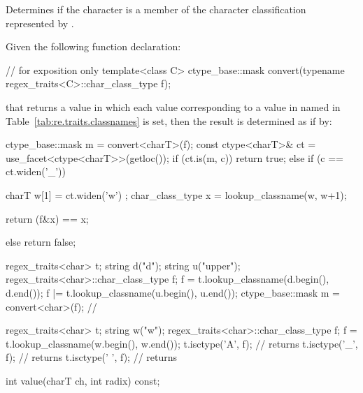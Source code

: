 \begin{itemdescr}
\pnum
\effects  Determines if the character  is a member of the character
classification represented by .

\pnum
\returns Given the following function declaration:
\begin{codeblock}
// for exposition only
template<class C>
  ctype_base::mask convert(typename regex_traits<C>::char_class_type f);
\end{codeblock}
that returns a value in which each  value corresponding to
a value in  named in Table~\ref{tab:re.traits.classnames} is set, then the
result is determined as if by:
\begin{codeblock}
ctype_base::mask m = convert<charT>(f);
const ctype<charT>& ct = use_facet<ctype<charT>>(getloc());
if (ct.is(m, c)) {
  return true;
} else if (c == ct.widen('_')) {
  charT w[1] = { ct.widen('w') };
  char_class_type x = lookup_classname(w, w+1);
  
  return (f&x) == x;
} else {
  return false;
} 
\end{codeblock}
\begin{example}
\begin{codeblock}

regex_traits<char> t;
string d("d");
string u("upper");
regex_traits<char>::char_class_type f;
f = t.lookup_classname(d.begin(), d.end());
f |= t.lookup_classname(u.begin(), u.end());
ctype_base::mask m = convert<char>(f); // 
\end{codeblock}
\end{example}
\begin{example}
\begin{codeblock}

regex_traits<char> t;
string w("w");
regex_traits<char>::char_class_type f;
f = t.lookup_classname(w.begin(), w.end());
t.isctype('A', f); // returns 
t.isctype('_', f); // returns 
t.isctype(' ', f); // returns 
\end{codeblock}
\end{example}

\end{itemdescr}

%
%
\begin{itemdecl}
int value(charT ch, int radix) const;
\end{itemdecl}

